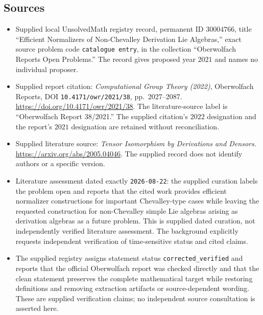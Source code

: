 \documentclass[11pt]{article}
\begin{document}
\subsection{Sources}
\begin{itemize}
\item[1.] Supplied local UnsolvedMath registry record, permanent ID \(30004766\), title ``Efficient Normalizers of Non-Chevalley Derivation Lie Algebras,'' exact source problem code \texttt{catalogue entry}, in the collection ``Oberwolfach Reports Open Problems.'' The record gives proposed year \(2021\) and names no individual proposer.
\item[2.] Supplied report citation: \emph{Computational Group Theory (2022)}, Oberwolfach Reports, DOI \texttt{10.4171/owr/2021/38}, pp.\ 2027--2087. \url{https://doi.org/10.4171/owr/2021/38}. The literature-source label is ``Oberwolfach Report 38/2021.'' The supplied citation's \(2022\) designation and the report's \(2021\) designation are retained without reconciliation.
\item[3.] Supplied literature source: \emph{Tensor Isomorphism by Derivations and Densors}. \url{https://arxiv.org/abs/2005.04046}. The supplied record does not identify authors or a specific version.
\item[4.] Literature assessment dated exactly \texttt{2026-08-22}: the supplied curation labels the problem open and reports that the cited work provides efficient normalizer constructions for important Chevalley-type cases while leaving the requested construction for non-Chevalley simple Lie algebras arising as derivation algebras as a future problem. This is supplied dated curation, not independently verified literature assessment. The background explicitly requests independent verification of time-sensitive status and cited claims.
\item[5.] The supplied registry assigns statement status \texttt{corrected\_verified} and reports that the official Oberwolfach report was checked directly and that the clean statement preserves the complete mathematical target while restoring definitions and removing extraction artifacts or source-dependent wording. These are supplied verification claims; no independent source consultation is asserted here.
\end{itemize}
\end{document}
